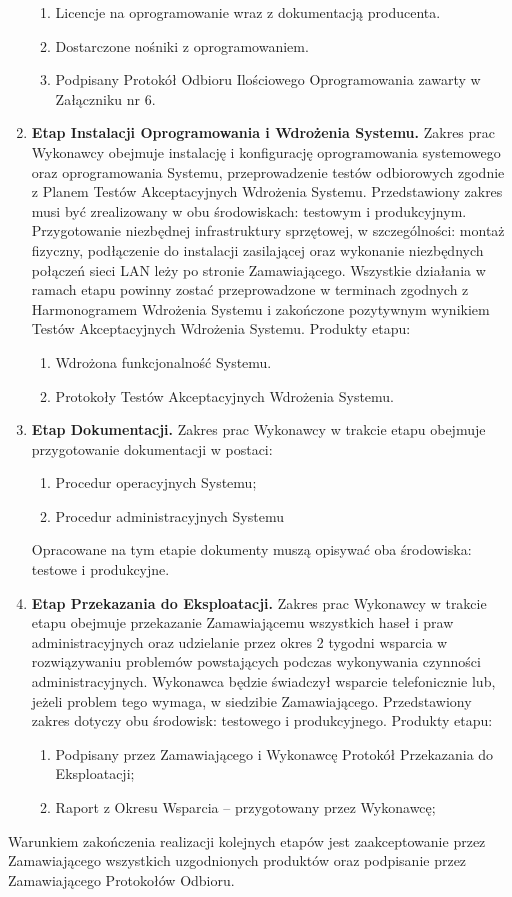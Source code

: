 \documentclass{article}
\begin{document}
\begin{enumerate}
\begin{enumerate}
\item Licencje na oprogramowanie wraz z dokumentacją producenta.
\item Dostarczone nośniki z oprogramowaniem.
\item Podpisany Protokół Odbioru Ilościowego Oprogramowania zawarty w Załączniku nr 6.
\end{enumerate}
\item \textbf{Etap Instalacji Oprogramowania i Wdrożenia Systemu.}
Zakres prac Wykonawcy obejmuje instalację i konfigurację oprogramowania systemowego oraz oprogramowania Systemu, przeprowadzenie testów odbiorowych zgodnie z Planem Testów Akceptacyjnych Wdrożenia Systemu. Przedstawiony zakres musi być zrealizowany w obu środowiskach: testowym i produkcyjnym. Przygotowanie niezbędnej infrastruktury sprzętowej, w szczególności: montaż fizyczny, podłączenie do instalacji zasilającej oraz wykonanie niezbędnych połączeń sieci LAN leży po stronie Zamawiającego. Wszystkie działania w ramach etapu powinny zostać przeprowadzone w terminach zgodnych z Harmonogramem Wdrożenia Systemu i zakończone pozytywnym wynikiem Testów Akceptacyjnych Wdrożenia Systemu. Produkty etapu:
\begin{enumerate}
\item Wdrożona funkcjonalność Systemu.
\item Protokoły Testów Akceptacyjnych Wdrożenia Systemu.
\end{enumerate}
\item \textbf{Etap Dokumentacji.} Zakres prac Wykonawcy w trakcie etapu obejmuje przygotowanie dokumentacji w postaci:
\begin{enumerate}
\item Procedur operacyjnych Systemu;
\item Procedur administracyjnych Systemu
\end{enumerate}
Opracowane na tym etapie dokumenty muszą opisywać oba środowiska: testowe i produkcyjne.
\item \textbf{Etap Przekazania do Eksploatacji.} Zakres prac Wykonawcy w trakcie etapu obejmuje przekazanie Zamawiającemu wszystkich haseł i praw administracyjnych oraz udzielanie przez okres 2 tygodni wsparcia w rozwiązywaniu problemów powstających podczas wykonywania czynności administracyjnych. Wykonawca będzie świadczył wsparcie telefonicznie lub, jeżeli problem tego wymaga, w siedzibie Zamawiającego. Przedstawiony zakres dotyczy obu środowisk: testowego i produkcyjnego. Produkty etapu:
\begin{enumerate}
\item Podpisany przez Zamawiającego i Wykonawcę Protokół Przekazania do Eksploatacji;
\item Raport z Okresu Wsparcia  – przygotowany przez Wykonawcę;
\end{enumerate}
\end{enumerate}
Warunkiem zakończenia realizacji kolejnych etapów jest zaakceptowanie przez Zamawiającego wszystkich uzgodnionych produktów oraz podpisanie przez Zamawiającego Protokołów Odbioru.
\end{document}
